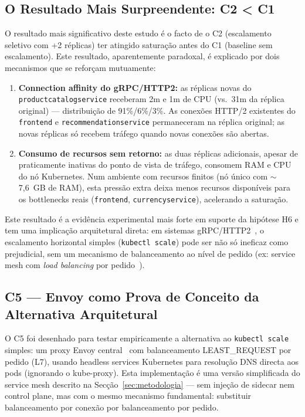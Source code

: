 \documentclass[acmsmall,screen=true,nonacm]{acmart}
\begin{document}
\subsection{O Resultado Mais Surpreendente: C2 < C1}

O resultado mais significativo deste estudo é o facto de o C2 (escalamento seletivo com +2 réplicas) ter atingido saturação antes do C1 (baseline sem escalamento). Este resultado, aparentemente paradoxal, é explicado por dois mecanismos que se reforçam mutuamente:

\begin{enumerate}
  \item \textbf{Connection affinity do gRPC/HTTP2:} as réplicas novas do \texttt{productcatalogservice} receberam 2m e 1m de CPU (vs.\ 31m da réplica original) — distribuição de 91\%/6\%/3\%. As conexões HTTP/2 existentes do \texttt{frontend} e \texttt{recommendationservice} permaneceram na réplica original; as novas réplicas só recebem tráfego quando novas conexões são abertas.

  \item \textbf{Consumo de recursos sem retorno:} as duas réplicas adicionais, apesar de praticamente inativas do ponto de vista de tráfego, consomem RAM e CPU do nó Kubernetes. Num ambiente com recursos finitos (nó único com $\sim$7,6~GB de RAM), esta pressão extra deixa menos recursos disponíveis para os bottlenecks reais (\texttt{frontend}, \texttt{currencyservice}), acelerando a saturação.
\end{enumerate}

Este resultado é a evidência experimental mais forte em suporte da hipótese H6 e tem uma implicação arquitetural direta: em sistemas gRPC/HTTP2~\cite{grpcloadbalancing}, o escalamento horizontal simples (\texttt{kubectl scale}) pode ser não só ineficaz como prejudicial, sem um mecanismo de balanceamento ao nível de pedido (ex: service mesh com \textit{load balancing} por pedido~\cite{k8sgrpc}).

\subsection{C5 — Envoy como Prova de Conceito da Alternativa Arquitetural}

O C5 foi desenhado para testar empiricamente a alternativa ao \texttt{kubectl scale} simples: um proxy Envoy central~\cite{grpcloadbalancing} com balanceamento LEAST\_REQUEST por pedido (L7), usando headless services Kubernetes para resolução DNS directa aos pods (ignorando o kube-proxy). Esta implementação é uma versão simplificada do service mesh descrito na Secção~\ref{sec:metodologia} — sem injeção de sidecar nem control plane, mas com o mesmo mecanismo fundamental: substituir balanceamento por conexão por balanceamento por pedido.
\end{document}
